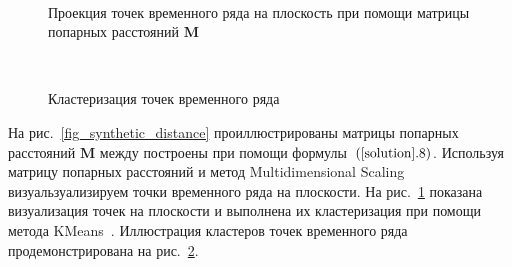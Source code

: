 \documentclass[12pt, twoside]{article}
\begin{document}
\begin{figure}[h!t]\center
{}
\\
\caption{Проекция точек временного ряда на плоскость при помощи матрицы попарных расстояний $\textbf{M}$}
\label{fig_synthetic_2D}
\end{figure}


\begin{figure}[h!t]\center
{}
\\
\caption{Кластеризация точек временного ряда}
\label{fig_synthetic_claster}
\end{figure}

На рис.~\ref{fig_synthetic_distance} проиллюстрированы матрицы попарных расстояний $\textbf{M}$ между построены при помощи формулы~$(\ref{solution}.8)$. Используя матрицу попарных расстояний и метод Multidimensional Scaling~\cite{Borg2005} визуальзуализируем точки временного ряда на плоскости. На рис.~\ref{fig_synthetic_2D} показана визуализация точек на плоскости и выполнена их кластеризация при помощи метода KMeans~\cite{Kanungo2000}. Иллюстрация кластеров точек временного ряда продемонстрирована на рис.~\ref{fig_synthetic_claster}.
\end{document}
